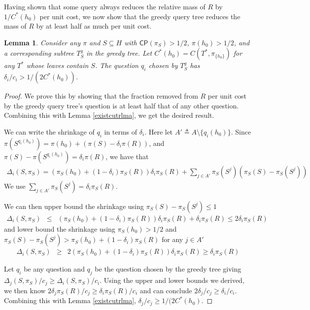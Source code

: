 \documentclass{article}
\newtheorem{lemma}{Lemma}
\begin{document}
Having shown that some query always reduces the relative mass of $R$ 
by $1/C^*(h_0)$ per unit cost, we now show that the greedy query tree reduces
the mass of $R$ by at least half as much per unit cost.
\begin{lemma} Consider any $\pi$ and $S \subseteq H$ with $\mathsf{CP}(\pi_S)
> 1/2$, $\pi(h_0) > 1/2$, 
and a corresponding subtree $T^g_S$ in the greedy tree.  Let
$C^*(h_0) = C(T^*, \pi_{\lbrace h_0 \rbrace})$ for any $T^*$ whose
leaves contain $S$.  The question $q_i$ chosen by $T^g_S$ 
has $\delta_i / c_i > 1/(2C^*(h_0))$.
\label{greedycutrlma} \end{lemma}
\begin{proof}
We prove this by showing that the fraction removed from $R$ per unit
cost by the greedy query tree's question is at least half that of any
other question.  Combining this with Lemma \ref{existcutrlma}, we get the
desired result.  

We can write the shrinkage of $q_i$ in terms
of $\delta_i$.  Here let $A' \triangleq A \setminus \lbrace q_i(h_0) \rbrace$.
Since $\pi(S^{q_i(h_0)}) = \pi(h_0) + \left( \pi(S) - \delta_i \pi(R) \right)$, 
and $\pi(S) - \pi(S^{q_i(h_0)}) = \delta_i \pi(R)$, we have that 
\begin{align*}
\Delta_i(S, \pi_S) = 
(\pi_S(h_0) + (1-\delta_i)\pi_S(R)) \delta_i \pi_S(R) 
 +  \sum_{j \in A'} \pi_S(S^j)(\pi_S(S)-\pi_S(S^j))
\end{align*}
We use $\sum_{j \in A'} \pi_S(S^j) = \delta_i \pi_S(R)$.

We can then upper bound the shrinkage using 
$\pi_S(S)-\pi_S(S^j) \leq 1 $
\begin{eqnarray*}
\Delta_i(S, \pi_S) 
& \leq & 
(\pi_S(h_0) + (1-\delta_i)\pi_S(R)) \delta_i \pi_S(R) + \delta_i \pi_S(R) 
\leq  2 \delta_i \pi_S(R) 
\end{eqnarray*}
and lower bound the shrinkage using 
$\pi_S(h_0) > 1/2$ and
$\pi_S(S)-\pi_S(S^j) > \pi_S(h_0) + (1-\delta_i)\pi_S(R)$ for any $j \in A'$
\begin{eqnarray*}
\Delta_i(S, \pi_S) 
&\geq & 2(\pi_S(h_0) + (1-\delta_i)\pi_S(R)) \delta_i \pi_S(R)  
\geq \delta_i \pi_S(R) 
\end{eqnarray*}

Let $q_i$ be any question and $q_j$ be the question chosen by the greedy tree
giving  $\Delta_j(S, \pi_S) / c_j \geq \Delta_i(S, \pi_S) / c_i$.
Using the upper and lower bounds we derived, we then know 
$2\delta_j \pi_S(R) / c_j \geq \delta_i \pi_S(R) / c_i$ and can conclude
$2\delta_j /c_j \geq \delta_i/c_i$.  
Combining this with Lemma \ref{existcutrlma},
$\delta_j /c_j \geq 1/(2C^*(h_0)$.  
\end{proof}
\end{document}
